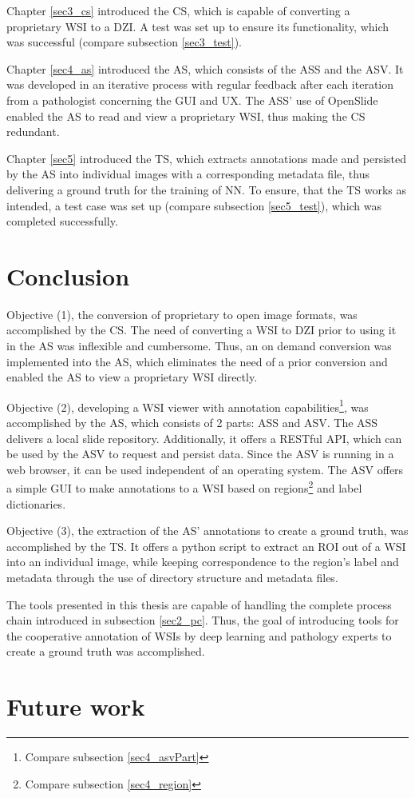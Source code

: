 Chapter \ref{sec3_cs} introduced the CS, which is capable of converting a proprietary WSI to a DZI. A test was set up to ensure its functionality, which was successful (compare subsection \ref{sec3_test}).

Chapter \ref{sec4_as} introduced the AS, which consists of the ASS and the ASV. It was developed in an iterative process with regular feedback after each iteration from a pathologist concerning the GUI and UX. The ASS' use of OpenSlide enabled the AS to read and view a proprietary WSI, thus making the CS redundant.

Chapter \ref{sec5} introduced the TS, which extracts annotations made and persisted by the AS into individual images with a corresponding metadata file, thus delivering a ground truth for the training of NN. To ensure, that the TS works as intended, a test case was set up (compare subsection \ref{sec5_test}), which was completed successfully.


\section{Conclusion}

Objective (1), the conversion of proprietary to open image formats, was accomplished by the CS. The need of converting a WSI to DZI prior to using it in the AS was inflexible and cumbersome. Thus, an on demand conversion was implemented into the AS, which eliminates the need of a prior conversion and enabled the AS to view a proprietary WSI directly.
 
Objective (2), developing a WSI viewer with annotation capabilities\footnote{
	Compare subsection \ref{sec4_asvPart}
}, was accomplished by the AS, which consists of 2 parts: ASS and ASV. The ASS delivers a local slide repository. Additionally, it offers a RESTful API, which can be used by the ASV to request and persist data. Since the ASV is running in a web browser, it can be used independent of an operating system. The ASV offers a simple GUI to make annotations to a WSI based on regions\footnote{
	Compare subsection \ref{sec4_region}
} and label dictionaries.

Objective (3), the extraction of the AS' annotations to create a ground truth, was accomplished by the TS. It offers a python script to extract an ROI out of a WSI into an individual image, while keeping correspondence to the region's label and metadata through the use of directory structure and metadata files.

The tools presented in this thesis are capable of handling the complete process chain introduced in subsection \ref{sec2_pc}. Thus, the goal of introducing tools for the cooperative annotation of WSIs by deep learning and pathology experts to create a ground truth was accomplished.



\section{Future work}
